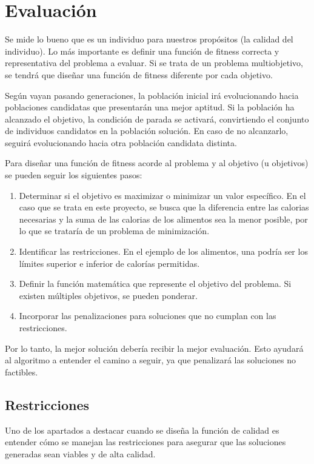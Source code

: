\section{Evaluación}
\label{ch:evaluacion}

Se mide lo bueno que es un individuo para nuestros propósitos (la calidad del individuo). Lo más importante es definir una función de fitness correcta y representativa del problema a evaluar. Si se trata de un problema multiobjetivo, se tendrá que diseñar una función de fitness diferente por cada objetivo.

Según vayan pasando generaciones, la población inicial irá evolucionando hacia poblaciones candidatas que presentarán una mejor aptitud. Si la población ha alcanzado el objetivo, la condición de parada se activará, convirtiendo el conjunto de individuos candidatos en la población solución. En caso de no alcanzarlo, seguirá evolucionando hacia otra población candidata distinta.

Para diseñar una función de fitness acorde al problema y al objetivo (u objetivos) se pueden seguir los siguientes pasos:

\begin{enumerate}
  \item Determinar si el objetivo es maximizar o minimizar un valor específico. En el caso que se trata en este proyecto, se busca que la diferencia entre las calorias necesarias y la suma de las calorias de los alimentos sea la menor posible, por lo que se trataría de un problema de minimización.
  \item Identificar las restricciones. En el ejemplo de los alimentos, una podría ser los límites superior e inferior de calorías permitidas.
  \item Definir la función matemática que represente el objetivo del problema. Si existen múltiples objetivos, se pueden ponderar.
  \item Incorporar las penalizaciones para soluciones que no cumplan con las restricciones.
\end{enumerate}

Por lo tanto, la mejor solución debería recibir la mejor evaluación. Esto ayudará al algoritmo a entender el camino a seguir, ya que penalizará las soluciones no factibles.

\subsection{Restricciones}

Uno de los apartados a destacar cuando se diseña la función de calidad es entender cómo se manejan las restricciones para asegurar que las soluciones generadas sean viables y de alta calidad.

